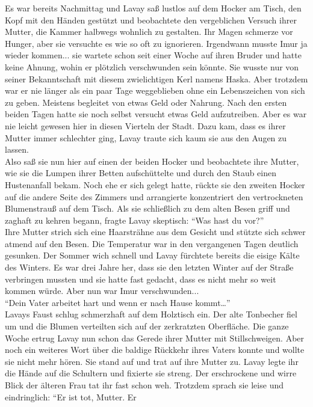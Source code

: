 Es war bereits Nachmittag und Lavay saß lustlos auf dem Hocker am Tisch, den Kopf mit den Händen 
gestützt und beobachtete den vergeblichen Versuch ihrer Mutter, die Kammer halbwegs wohnlich zu 
gestalten. Ihr Magen schmerze vor Hunger, aber sie versuchte es wie so oft zu ignorieren. 
Irgendwann musste Imur ja wieder kommen... sie wartete schon seit einer Woche auf ihren Bruder 
und hatte keine Ahnung, wohin er plötzlich verschwunden sein könnte. Sie wusste nur von seiner 
Bekanntschaft mit diesem zwielichtigen Kerl namens Haska. Aber trotzdem war er nie länger als ein 
paar Tage weggeblieben ohne ein Lebenszeichen von sich zu geben. Meistens begleitet von etwas 
Geld oder Nahrung. Nach den ersten beiden Tagen hatte sie noch selbst versucht etwas Geld 
aufzutreiben. Aber es war nie leicht gewesen hier in diesen Vierteln der Stadt. Dazu kam, dass 
es ihrer Mutter immer schlechter ging, Lavay traute sich kaum sie aus den Augen zu lassen.\\
Also saß sie nun hier auf einen der beiden Hocker und beobachtete ihre Mutter, wie sie die 
Lumpen ihrer Betten aufschüttelte und durch den Staub einen Hustenanfall bekam. Noch ehe er sich 
gelegt hatte, rückte sie den zweiten Hocker auf die andere Seite des Zimmers und arrangierte 
konzentriert den vertrockneten Blumenstrauß auf dem Tisch. Als sie schließlich zu dem alten Besen 
griff und zaghaft zu kehren begann, fragte Lavay skeptisch: ``Was hast du vor?''\\
Ihre Mutter strich sich eine Haarsträhne aus dem Gesicht und stützte sich schwer atmend auf den 
Besen. Die Temperatur war in den vergangenen Tagen deutlich gesunken. Der Sommer wich schnell und 
Lavay fürchtete bereits die eisige Kälte des Winters. Es war drei Jahre her, dass sie den letzten 
Winter auf der Straße verbringen mussten und sie hatte fast gedacht, dass es nicht mehr so weit 
kommen würde. Aber nun war Imur verschwunden...\\
``Dein Vater arbeitet hart und wenn er nach Hause kommt…''\\
Lavays Faust schlug schmerzhaft auf dem Holztisch ein. Der alte Tonbecher fiel um und die Blumen 
verteilten sich auf der zerkratzten Oberfläche. Die ganze Woche ertrug Lavay nun schon das Gerede 
ihrer Mutter mit Stillschweigen. Aber noch ein weiteres Wort über die baldige Rückkehr ihres Vaters 
konnte und wollte sie nicht mehr hören. Sie stand auf und trat auf ihre Mutter zu. Lavay legte ihr 
die Hände auf die Schultern und fixierte sie streng. Der erschrockene und wirre Blick der älteren 
Frau tat ihr fast schon weh. Trotzdem sprach sie leise und eindringlich: ``Er ist tot, Mutter. Er 
